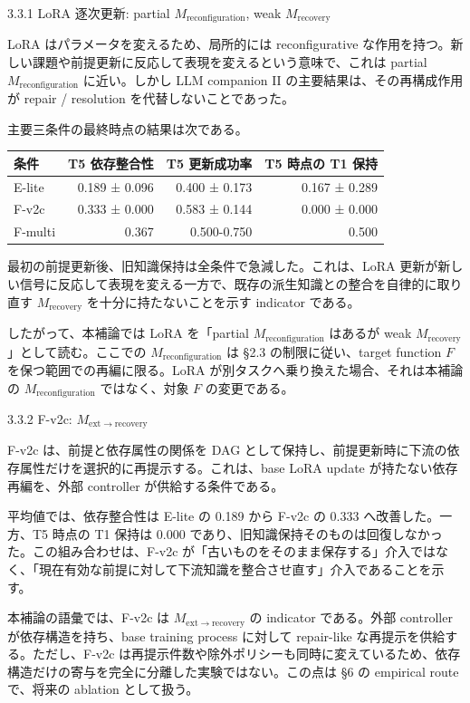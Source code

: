 \documentclass[12pt,a4paper]{article}
\begin{document}
3.3.1 LoRA 逐次更新: partial \(M_{\mathrm{reconfiguration}}\), weak \(M_{\mathrm{recovery}}\)

LoRA はパラメータを変えるため、局所的には reconfigurative な作用を持つ。新しい課題や前提更新に反応して表現を変えるという意味で、これは partial \(M_{\mathrm{reconfiguration}}\) に近い。しかし LLM companion II の主要結果は、その再構成作用が repair / resolution を代替しないことであった。

主要三条件の最終時点の結果は次である。

{\def\LTcaptype{table} %
\begin{longtable}[]{@{}lrrr@{}}
\toprule\noalign{}
条件 & T5 依存整合性 & T5 更新成功率 & T5 時点の T1 保持 \\
\midrule\noalign{}
\endhead
\bottomrule\noalign{}
\endlastfoot
E-lite & 0.189 ± 0.096 & 0.400 ± 0.173 & 0.167 ± 0.289 \\
F-v2c & 0.333 ± 0.000 & 0.583 ± 0.144 & 0.000 ± 0.000 \\
F-multi & 0.367 & 0.500-0.750 & 0.500 \\
\end{longtable}
}

最初の前提更新後、旧知識保持は全条件で急減した。これは、LoRA 更新が新しい信号に反応して表現を変える一方で、既存の派生知識との整合を自律的に取り直す \(M_{\mathrm{recovery}}\) を十分に持たないことを示す indicator である。

したがって、本補論では LoRA を「partial \(M_{\mathrm{reconfiguration}}\) はあるが weak \(M_{\mathrm{recovery}}\)」として読む。ここでの \(M_{\mathrm{reconfiguration}}\) は §2.3 の制限に従い、target function \(F\) を保つ範囲での再編に限る。LoRA が別タスクへ乗り換えた場合、それは本補論の \(M_{\mathrm{reconfiguration}}\) ではなく、対象 \(F\) の変更である。

3.3.2 F-v2c: \(M_{\mathrm{ext}\to\mathrm{recovery}}\)

F-v2c は、前提と依存属性の関係を DAG として保持し、前提更新時に下流の依存属性だけを選択的に再提示する。これは、base LoRA update が持たない依存再編を、外部 controller が供給する条件である。

平均値では、依存整合性は E-lite の 0.189 から F-v2c の 0.333 へ改善した。一方、T5 時点の T1 保持は 0.000 であり、旧知識保持そのものは回復しなかった。この組み合わせは、F-v2c が「古いものをそのまま保存する」介入ではなく、「現在有効な前提に対して下流知識を整合させ直す」介入であることを示す。

本補論の語彙では、F-v2c は \(M_{\mathrm{ext}\to\mathrm{recovery}}\) の indicator である。外部 controller が依存構造を持ち、base training process に対して repair-like な再提示を供給する。ただし、F-v2c は再提示件数や除外ポリシーも同時に変えているため、依存構造だけの寄与を完全に分離した実験ではない。この点は §6 の empirical route で、将来の ablation として扱う。
\end{document}

